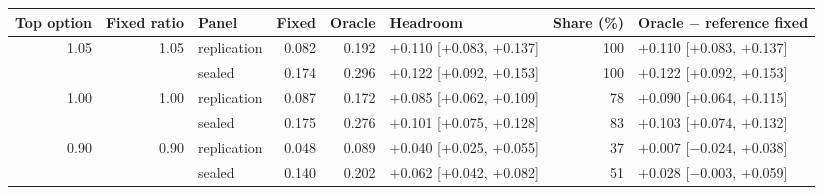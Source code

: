\begin{tabular}{rrlrrlrl}
\toprule
Top option & Fixed ratio & Panel & Fixed & Oracle & Headroom & Share (\%) & Oracle $-$ reference fixed \\
\midrule
1.05 & 1.05 & replication & 0.082 & 0.192 & $+$0.110 [$+$0.083, $+$0.137] & 100 & $+$0.110 [$+$0.083, $+$0.137] \\
 &  & sealed & 0.174 & 0.296 & $+$0.122 [$+$0.092, $+$0.153] & 100 & $+$0.122 [$+$0.092, $+$0.153] \\
1.00 & 1.00 & replication & 0.087 & 0.172 & $+$0.085 [$+$0.062, $+$0.109] & 78 & $+$0.090 [$+$0.064, $+$0.115] \\
 &  & sealed & 0.175 & 0.276 & $+$0.101 [$+$0.075, $+$0.128] & 83 & $+$0.103 [$+$0.074, $+$0.132] \\
0.90 & 0.90 & replication & 0.048 & 0.089 & $+$0.040 [$+$0.025, $+$0.055] & 37 & $+$0.007 [$-$0.024, $+$0.038] \\
 &  & sealed & 0.140 & 0.202 & $+$0.062 [$+$0.042, $+$0.082] & 51 & $+$0.028 [$-$0.003, $+$0.059] \\
\bottomrule
\end{tabular}
